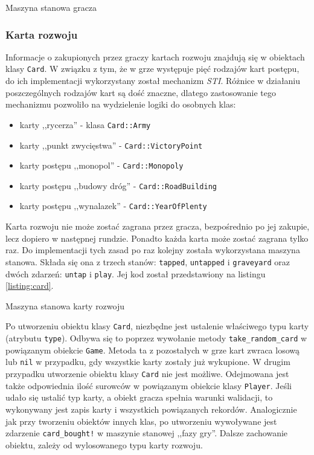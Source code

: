 \documentclass[a4paper,12pt]{article}
\begin{document}
\begin{listing}
  
  \caption{Maszyna stanowa gracza}
  \label{listing:player}
\end{listing}

\subsubsection{Karta rozwoju}
Informacje o zakupionych przez graczy kartach rozwoju znajdują się w
obiektach klasy \texttt{Card}. W związku z tym, że w grze występuje
pięć rodzajów kart postępu, do ich implementacji wykorzystany został
mechanizm \emph{STI}. Różnice w działaniu poszczególnych rodzajów kart
są dość znaczne, dlatego zastosowanie tego mechanizmu pozwoliło na
wydzielenie logiki do osobnych klas:

\begin{itemize}
\item karty ,,rycerza'' - klasa \texttt{Card::Army}
\item karty ,,punkt zwycięstwa'' - \texttt{Card::VictoryPoint}
\item karty postępu ,,monopol'' - \texttt{Card::Monopoly}
\item karty postępu ,,budowy dróg'' - \texttt{Card::RoadBuilding}
\item karty postępu ,,wynalazek'' - \texttt{Card::YearOfPlenty}
\end{itemize}

Karta rozwoju nie może zostać zagrana przez gracza, bezpośrednio po
jej zakupie, lecz dopiero w następnej rundzie. Ponadto każda karta
może zostać zagrana tylko raz. Do implementacji tych zasad po raz
kolejny została wykorzystana maszyna stanowa. Składa się ona z trzech
stanów: \texttt{tapped}, \texttt{untapped} i \texttt{graveyard} oraz
dwóch zdarzeń: \texttt{untap} i \texttt{play}. Jej kod został
przedstawiony na listingu \ref{listing:card}.

\begin{listing}
  
  \caption{Maszyna stanowa karty rozwoju}
  \label{listing:card}
\end{listing}

Po utworzeniu obiektu klasy \texttt{Card}, niezbędne jest ustalenie
właściwego typu karty (atrybutu \texttt{type}). Odbywa się to poprzez
wywołanie metody \texttt{take\_random\_card} w powiązanym obiekcie
\texttt{Game}. Metoda ta z pozostałych w grze kart zwraca losową lub
\texttt{nil} w przypadku, gdy wszystkie karty zostały już wykupione. W
drugim przypadku utworzenie obiektu klasy \texttt{Card} nie jest
możliwe. Odejmowana jest także odpowiednia ilość surowców w powiązanym
obiekcie klasy \texttt{Player}. Jeśli udało się ustalić typ karty, a
obiekt gracza spełnia warunki walidacji, to wykonywany jest zapis
karty i wszystkich powiązanych rekordów. Analogicznie jak przy
tworzeniu obiektów innych klas, po utworzeniu wywoływane jest
zdarzenie \texttt{card\_bought!} w maszynie stanowej ,,fazy
gry''. Dalsze zachowanie obiektu, zależy od wylosowanego typu karty
rozwoju.
\end{document}
